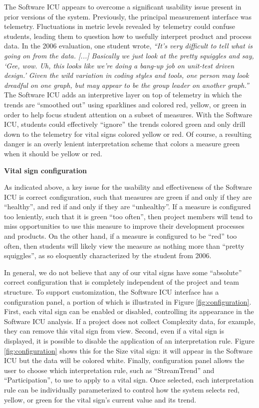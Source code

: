 \documentclass{acm_proc_article-sp}
\begin{document}
The Software ICU appears to overcome a significant usability issue present
in prior versions of the system. Previously, the principal measurement
interface was telemetry.  Fluctuations in metric levels revealed by
telemetry could confuse students, leading them to question how to usefully
interpret product and process data.  In the 2006 evaluation, one student
wrote, {\em ``It's very difficult to tell what is going on from the
data. [...] Basically we just look at the pretty squiggles and say, `Gee,
wow. Uh, this looks like we're doing a bang-up job on unit-test driven
design.' Given the wild variation in coding styles and tools, one person
may look dreadful on one graph, but may appear to be the group leader on
another graph.''}  The Software ICU adds an interpretive layer on top of
telemetry in which the trends are ``smoothed out'' using sparklines and
colored red, yellow, or green in order to help focus student attention on a
subset of measures.  With the Software ICU, students could effectively
``ignore'' the trends colored green and only drill down to the telemetry
for vital signs colored yellow or red.  Of course, a resulting danger is an
overly lenient interpretation scheme that colors a measure green when it
should be yellow or red.

{\bf Vital sign configuration}

As indicated above, a key issue for the usability and effectiveness of the
Software ICU is correct configuration, such that measures are green if and
only if they are ``healthy'', and red if and only if they are
``unhealthy''.  If a measure is configured too leniently, such that it is
green ``too often'', then project members will tend to miss opportunities
to use this measure to improve their development processes and products.
On the other hand, if a measure is configured to be ``red'' too often, then
students will likely view the measure as nothing more than ``pretty
squiggles'', as so eloquently characterized by the student from 2006.

In general, we do not believe that any of our vital signs have some
``absolute'' correct configuration that is completely independent of the project and
team structure.  To support customization, the Software ICU interface has a
configuration panel, a portion of which is illustrated in Figure
\ref{fig:configuration}.  First, each vital sign can be enabled or
disabled, controlling its appearance in the Software ICU analysis. If a
project does not collect Complexity data, for example, they can remove this
vital sign from view.  Second, even if a vital sign is displayed, it is
possible to disable the application of an interpretation rule.  Figure
\ref{fig:configuration} shows this for the Size vital sign: it will appear
in the Software ICU but the data will be colored white.  Finally,
configuration panel allows the user to choose which interpretation rule,
such as ``StreamTrend'' and ``Participation'', to use to apply to a vital
sign. Once selected, each interpretation rule can be individually
parameterized to control how the system selects red, yellow, or green for
the vital sign's current value and its trend.
\end{document}
